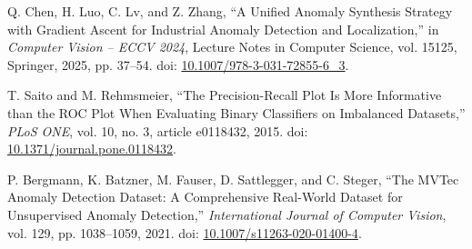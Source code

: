 Q. Chen, H. Luo, C. Lv, and Z. Zhang,
``A Unified Anomaly Synthesis Strategy with Gradient Ascent
for Industrial Anomaly Detection and Localization,''
in \textit{Computer Vision -- ECCV 2024},
Lecture Notes in Computer Science, vol. 15125,
Springer, 2025, pp. 37--54.
doi:
\href{https://doi.org/10.1007/978-3-031-72855-6_3}
{10.1007/978-3-031-72855-6\_3}.

T. Saito and M. Rehmsmeier,
``The Precision-Recall Plot Is More Informative than the ROC Plot
When Evaluating Binary Classifiers on Imbalanced Datasets,''
\textit{PLoS ONE}, vol. 10, no. 3, article e0118432, 2015.
doi: \href{https://doi.org/10.1371/journal.pone.0118432}
{10.1371/journal.pone.0118432}.

P. Bergmann, K. Batzner, M. Fauser, D. Sattlegger, and C. Steger,
``The MVTec Anomaly Detection Dataset: A Comprehensive Real-World
Dataset for Unsupervised Anomaly Detection,''
\textit{International Journal of Computer Vision},
vol. 129, pp. 1038--1059, 2021.
doi: \href{https://doi.org/10.1007/s11263-020-01400-4}
{10.1007/s11263-020-01400-4}.
